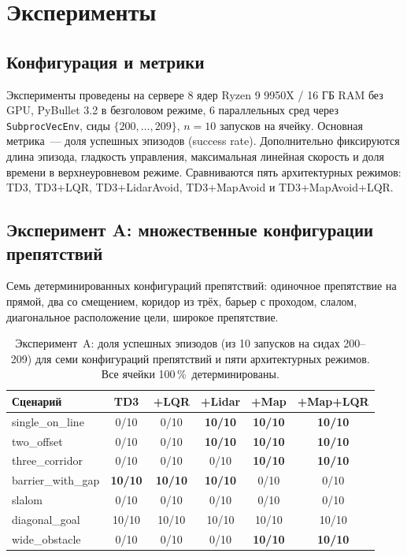 \documentclass[11pt]{article}
\begin{document}
\section{Эксперименты}
\label{sec:experiments}

\subsection{Конфигурация и метрики}
\label{sec:exp_setup}

Эксперименты проведены на сервере 8 ядер Ryzen 9 9950X / 16 ГБ RAM без GPU, PyBullet 3.2 в безголовом режиме, 6 параллельных сред через \verb|SubprocVecEnv|, сиды $\{200, \ldots, 209\}$, $n = 10$ запусков на ячейку. Основная метрика~--- доля успешных эпизодов (success rate). Дополнительно фиксируются длина эпизода, гладкость управления, максимальная линейная скорость и доля времени в верхнеуровневом режиме. Сравниваются пять архитектурных режимов: TD3, TD3+LQR, TD3+LidarAvoid, TD3+MapAvoid и TD3+MapAvoid+LQR.


\subsection{Эксперимент A: множественные конфигурации препятствий}
\label{sec:exp_a}

Семь детерминированных конфигураций препятствий: одиночное препятствие на прямой, два со смещением, коридор из трёх, барьер с проходом, слалом, диагональное расположение цели, широкое препятствие.

\begin{table}[h]
\begin{center}
\begin{tabular}{lccccc}
\toprule
Сценарий & TD3 & +LQR & +Lidar & +Map & +Map+LQR \\
\midrule
single\_on\_line     & 0/10 & 0/10 & \textbf{10/10} & \textbf{10/10} & \textbf{10/10} \\
two\_offset         & 0/10 & 0/10 & \textbf{10/10} & \textbf{10/10} & \textbf{10/10} \\
three\_corridor     & 0/10 & 0/10 & 0/10           & \textbf{10/10} & \textbf{10/10} \\
barrier\_with\_gap  & \textbf{10/10} & \textbf{10/10} & \textbf{10/10} & 0/10 & 0/10 \\
slalom              & 0/10 & 0/10 & 0/10 & 0/10           & 0/10           \\
diagonal\_goal      & 10/10 & 10/10 & 10/10 & 10/10        & 10/10         \\
wide\_obstacle      & 0/10 & 0/10 & 0/10 & \textbf{10/10} & \textbf{10/10} \\
\bottomrule
\end{tabular}
\caption{Эксперимент~A: доля успешных эпизодов (из 10 запусков на сидах
200--209) для семи конфигураций препятствий и пяти архитектурных режимов.
Все ячейки 100\,\%~детерминированы.}
\label{tab:exp_a}
\end{center}
\end{table}
\end{document}
